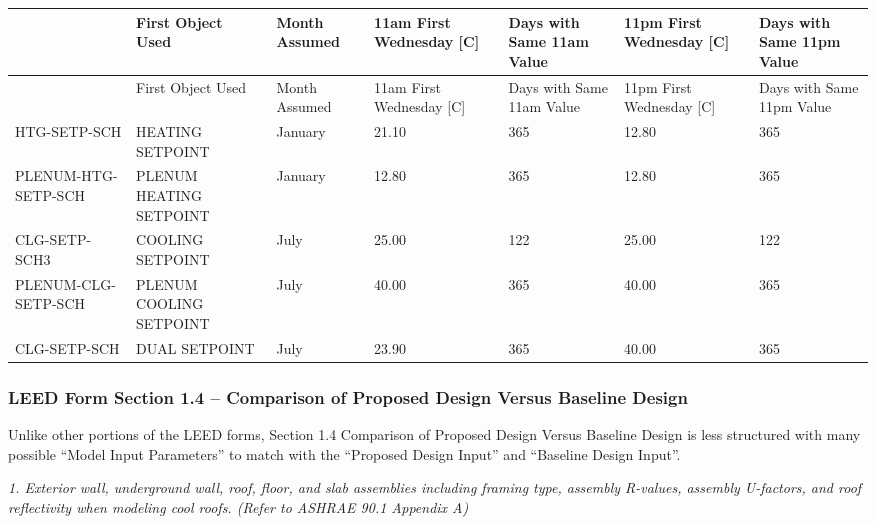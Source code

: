 \begin{longtable}[c]{>{\raggedright}p{0.85in}>{\raggedright}p{0.85in}>{\raggedright}p{0.85in}>{\raggedright}p{0.85in}>{\raggedright}p{0.85in}>{\raggedright}p{0.85in}>{\raggedright}p{0.85in}}
\toprule
 & First Object Used     & Month Assumed & 11am First Wednesday [C] & Days with Same 11am Value & 11pm First Wednesday [C] & Days with Same 11pm Value \tabularnewline
\midrule
\endfirsthead

\toprule
 & First Object Used     & Month Assumed & 11am First Wednesday [C] & Days with Same 11am Value & 11pm First Wednesday [C] & Days with Same 11pm Value \tabularnewline
\midrule
\endhead

    HTG-SETP-SCH       & HEATING SETPOINT       & January       &        21.10             &          365              &        12.80             &          365              \tabularnewline
    PLENUM-HTG-SETP-SCH & PLENUM HEATING SETPOINT & January       &        12.80             &          365              &        12.80             &          365              \tabularnewline
    CLG-SETP-SCH3      & COOLING SETPOINT       & July          &        25.00             &          122              &        25.00             &          122              \tabularnewline
    PLENUM-CLG-SETP-SCH & PLENUM COOLING SETPOINT & July          &        40.00             &          365              &        40.00             &          365              \tabularnewline
    CLG-SETP-SCH       & DUAL SETPOINT          & July          &        23.90             &          365              &        40.00             &          365              \tabularnewline

\bottomrule
\end{longtable}


\subsubsection{LEED Form Section 1.4 -- Comparison of Proposed Design Versus Baseline Design}\label{leed-form-section-1.4-comparison-of-proposed-design-versus-baseline-design}

Unlike other portions of the LEED forms, Section 1.4 Comparison of Proposed Design Versus Baseline Design is less structured with many possible ``Model Input Parameters'' to match with the ``Proposed Design Input'' and ``Baseline Design Input''.

\emph{1. Exterior wall, underground wall, roof, floor, and slab assemblies including framing type, assembly R-values, assembly U-factors, and roof reflectivity when modeling cool roofs. (Refer to ASHRAE 90.1 Appendix A)}

